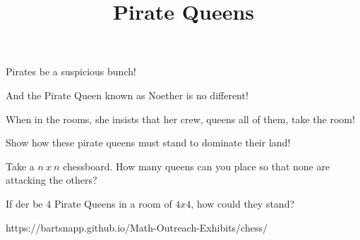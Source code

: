 \documentclass{../exhibit}
\title{Pirate Queens}
\begin{document}
\begin{context}
  Pirates be a suspicious bunch!


  And the Pirate Queen known as Noether is no different!


  When in the rooms, she insists that her crew, queens all of them, take the room!

    
  Show how these pirate queens must stand to dominate their land!
\end{context}



\begin{directions}
  Take a $n\ x\ n$ chessboard. How many queens can you place so that
  none are attacking the others?
\end{directions}



\begin{example}
 If der be $4$ Pirate Queens in a room of $4x4$, how could they stand?


\end{example}



\begin{mathConnections}
  https://bartsnapp.github.io/Math-Outreach-Exhibits/chess/
\end{mathConnections}
\end{document}
